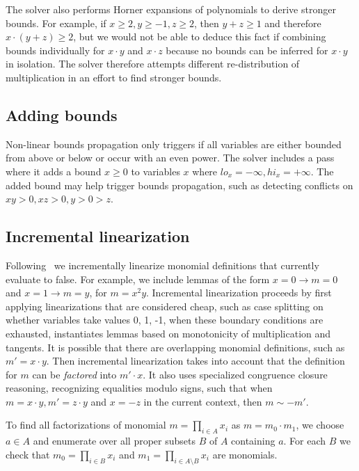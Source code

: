 The solver also performs Horner expansions of polynomials to derive stronger bounds.
For example, if $x \geq 2, y \geq -1, z \geq 2$, then $y + z \geq 1$ 
and therefore $x\cdot (y + z) \geq 2$, but we would not be
able to deduce this fact if combining bounds individually for $x\cdot y$ 
and $x \cdot z$ because no bounds can be inferred for $x \cdot y$ in isolation.
The solver therefore attempts different re-distribution of multiplication
in an effort to find stronger bounds.


\subsection{Adding bounds}
Non-linear bounds propagation only triggers if all variables are either bounded from above or below or occur with an even power.
The solver includes a pass where it adds a bound $x \geq 0$ to variables $x$ where $lo_x = -\infty, hi_x = +\infty$.
The added bound may help trigger bounds propagation, such as detecting conflicts on $xy > 0, xz > 0, y > 0 > z$.





\subsection{Incremental linearization}
Following~\cite{CimattiGIRS18} we incrementally linearize monomial definitions that
currently evaluate to false.
For example, we include lemmas of the form $x = 0 \rightarrow m = 0$
and $x = 1 \rightarrow m = y$, for $m = x^2y$.
Incremental linearization proceeds by first applying linearizations that are considered cheap,
such as case splitting on whether variables take values 0, 1, -1, when these boundary conditions
are exhausted, instantiates lemmas based on monotonicity of multiplication and tangents.
It is possible that there are overlapping monomial definitions, such as $m' = x \cdot y$.
Then incremental linearization takes into account that the definition for $m$ can be
\emph{factored} into $m' \cdot x$. It also uses specialized congruence closure reasoning,
recognizing equalities modulo signs, such that when $m = x \cdot y, m' = z \cdot y$ and
$x = -z$ in the current context, then $m \sim -m'$.

To find all factorizations of monomial $m = \prod_{i \in A}{x_i} $ as $m = m_0 \cdot m_1$, we choose $a \in A$ and enumerate over all proper subsets $B$ of $A$ containing $a$. For each $B$ we check that $m_0 = \prod_{i \in B}{x_i}$ and $m_1 = \prod_{i \in A \setminus B}{x_i}$ are monomials.

